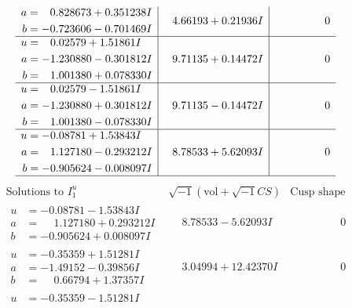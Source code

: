 \documentclass[1p]{elsarticle_modified}
\theoremstyle{definition}
\newcommand{\I}{\sqrt{-1}}
\begin{document}
$$\begin{array}{c|c|c}
\begin{aligned}
a &= \phantom{-}0.828673 + 0.351238 I \\
b &= -0.723606 - 0.701469 I\end{aligned}
 & \phantom{-}4.66193 + 0.21936 I & \phantom{-0.000000 } 0 \\ \hline\begin{aligned}
u &= \phantom{-}0.02579 + 1.51861 I \\
a &= -1.230880 - 0.301812 I \\
b &= \phantom{-}1.001380 + 0.078330 I\end{aligned}
 & \phantom{-}9.71135 + 0.14472 I & \phantom{-0.000000 } 0 \\ \hline\begin{aligned}
u &= \phantom{-}0.02579 - 1.51861 I \\
a &= -1.230880 + 0.301812 I \\
b &= \phantom{-}1.001380 - 0.078330 I\end{aligned}
 & \phantom{-}9.71135 - 0.14472 I & \phantom{-0.000000 } 0 \\ \hline\begin{aligned}
u &= -0.08781 + 1.53843 I \\
a &= \phantom{-}1.127180 - 0.293212 I \\
b &= -0.905624 - 0.008097 I\end{aligned}
 & \phantom{-}8.78533 + 5.62093 I & \phantom{-0.000000 } 0\\
 \hline 
 \end{array}$$\newpage$$\begin{array}{c|c|c}  
\text{Solutions to }I^u_{1}& \I (\text{vol} + \sqrt{-1}CS) & \text{Cusp shape}\\
 \hline 
\begin{aligned}
u &= -0.08781 - 1.53843 I \\
a &= \phantom{-}1.127180 + 0.293212 I \\
b &= -0.905624 + 0.008097 I\end{aligned}
 & \phantom{-}8.78533 - 5.62093 I & \phantom{-0.000000 } 0 \\ \hline\begin{aligned}
u &= -0.35359 + 1.51281 I \\
a &= -1.49152 - 0.39856 I \\
b &= \phantom{-}0.66794 + 1.37357 I\end{aligned}
 & \phantom{-}3.04994 + 12.42370 I & \phantom{-0.000000 } 0 \\ \hline\begin{aligned}
u &= -0.35359 - 1.51281 I \\

\end{aligned}
\end{array}$$
\end{document}
